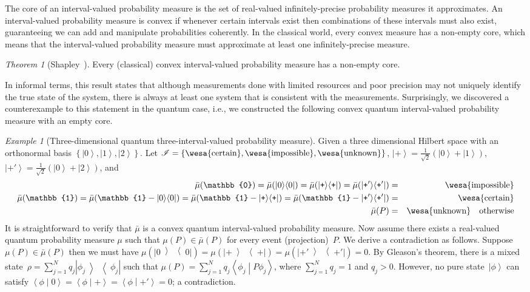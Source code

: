 \documentclass{article}
\theoremstyle{remark}
\newtheorem{example}{Example}\newtheorem{definition}{Definition}\newtheorem{thm}{Theorem}
\newcommand{\imposs}{{\mbox{\wesa{impossible}}}}
\newcommand{\necess}{{\mbox{\wesa{certain}}}}
\newcommand{\unknown}{{\mbox{\wesa{unknown}}}}
\newcommand{\ket}[1]{{\left\vert{#1}\right\rangle}}
\newcommand{\op}[2]{\ensuremath{\left\vert{#1}\middle\rangle\middle\langle{#2}\right\vert}}
\newcommand{\proj}[1]{\op{#1}{#1}}
\newcommand{\ps}{\texttt{+}}
\newcommand{\ip}[2]{\ensuremath{\left\langle{#1}\middle\vert{#2}\right\rangle}}
\begin{document}
\noindent The core of an interval-valued probability measure is the
set of real-valued infinitely-precise probability measures it approximates.
An interval-valued probability measure is convex if whenever certain
intervals exist then combinations of these intervals must also exist,
guaranteeing we can add and manipulate probabilities coherently. In
the classical world, every convex measure has a non-empty core, which
means that the interval-valued probability measure must approximate
at least one infinitely-precise measure.

\begin{thm}[Shapley~\cite{Shapley1971,Grabisch2016}]\label{thm:Shapley}
Every (classical) convex interval-valued probability measure has a
non-empty core. \end{thm}

In informal terms, this result states that although measurements done
with limited resources and poor precision may not uniquely identify
the true state of the system, there is always at least one system
that is consistent with the measurements. Surprisingly, we discovered
a counterexample to this statement in the quantum case, i.e., we constructed
the following convex quantum interval-valued probability measure with
an empty core.

\begin{example}[Three-dimensional quantum three-interval-valued probability measure]\label{ex:three-dimensional-three-value}
Given a three dimensional Hilbert space with an orthonormal basis
$\left\{ \ket{0},\ket{1},\ket{2}\right\} $. Let\emph{ $\mathscr{I}=\left\{ \necess,\imposs,\unknown\right\} $},
$\ket{\ps}=\frac{1}{\sqrt{2}}(\ket{0}+\ket{1})$, $\ket{\ps'}=\frac{1}{\sqrt{2}}(\ket{0}+\ket{2})$,
and 
\begin{eqnarray*}
\bar{\mu}(\mathbb{0})=\bar{\mu}(\proj{0})=\bar{\mu}(\proj{\ps})=\bar{\mu}(\proj{\ps'}) & = & \imposs\\
\bar{\mu}(\mathbb{1})=\bar{\mu}(\mathbb{1}-\proj{0})=\bar{\mu}(\mathbb{1}-\proj{\ps})=\bar{\mu}(\mathbb{1}-\proj{\ps'}) & = & \necess\\
\bar{\mu}(P) & = & \unknown\quad\textrm{otherwise}
\end{eqnarray*}
It is straightforward to verify that $\bar{\mu}$ is a convex quantum
interval-valued probability measure. Now assume there exists a real-valued
quantum probability measure $\mu$ such that $\mu(P)\in\bar{\mu}(P)$
for every event (projection)~$P$. We derive a contradiction as follows.
Suppose $\mu(P)\in\bar{\mu}(P)$ then we must have $\mu(\proj{0})=\mu(\proj{\ps})=\mu(\proj{\ps'})=0$.
By Gleason's theorem, there is a mixed state~$\rho=\sum_{j=1}^{N}q_{j}\proj{\phi_{j}}$
such that $\mu\left(P\right)=\sum_{j=1}^{N}q_{j}\ip{\phi_{j}}{P\phi_{j}}$,
where $\sum_{j=1}^{N}q_{j}=1$ and $q_{j}>0$. However, no pure state~$\ket{\phi}$
can satisfy $\ip{\phi}{0}=\ip{\phi}{\ps}=\ip{\phi}{\ps'}=0$; a contradiction.
\end{example}
\end{document}

